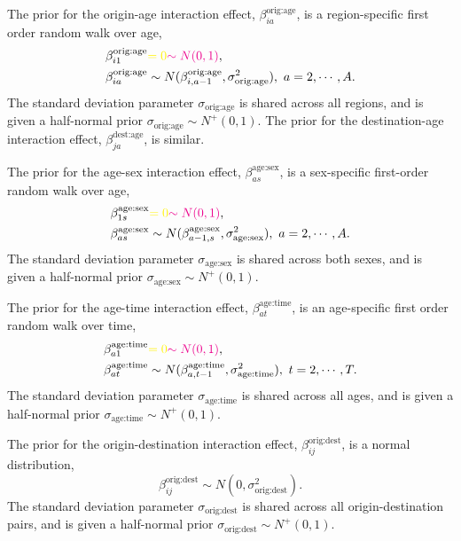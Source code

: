 \documentclass{article}
\begin{document}
The prior for the origin-age interaction effect, $\beta_{ia}^{\text{orig:age}}$, is a region-specific first order random walk over age,
\begin{equation}
\begin{aligned}
\beta_{i1}^{\text{orig:age}}&{\color{yellow}=0}{\color{magenta}\sim N(0,1)},\\
\beta_{ia}^{\text{orig:age}}&\sim N(\beta_{i,a-1}^{\text{orig:age}},\sigma_{\text{orig:age}}^2),\ a=2,\cdots,A.
\end{aligned}
\end{equation}
The standard deviation parameter $\sigma_{\text{orig:age}}$ is shared across all regions, and is given a half-normal prior $\sigma_{\text{orig:age}}\sim N^+(0,1)$. The prior for the destination-age interaction effect, $\beta_{ja}^{\text{dest:age}}$, is similar.

The prior for the age-sex interaction effect, $\beta_{as}^{\text{age:sex}}$, is a sex-specific first-order random walk over age,
\begin{equation}
\begin{aligned}
\beta_{1s}^{\text{age:sex}}&{\color{yellow}=0}{\color{magenta}\sim N(0,1)},\\
\beta_{as}^{\text{age:sex}}&\sim N(\beta_{a-1,s}^{\text{age:sex}},\sigma_{\text{age:sex}}^2),\ a=2,\cdots,A.
\end{aligned}
\end{equation}
The standard deviation parameter $\sigma_{\text{age:sex}}$ is shared across both sexes, and is given a half-normal prior $\sigma_{\text{age:sex}}\sim N^+(0,1)$.

The prior for the age-time interaction effect, $\beta_{at}^{\text{age:time}}$, is an age-specific first order random walk over time, \begin{equation}
\begin{aligned}
\beta_{a1}^{\text{age:time}}&{\color{yellow}=0}{\color{magenta}\sim N(0,1)},\\
\beta_{at}^{\text{age:time}}&\sim N(\beta_{a,t-1}^{\text{age:time}},\sigma_{\text{age:time}}^2),\ t=2,\cdots,T.
\end{aligned}
\end{equation}
The standard deviation parameter $\sigma_{\text{age:time}}$ is shared across all ages, and is given a half-normal prior $\sigma_{\text{age:time}}\sim N^+(0,1)$.

The prior for the origin-destination interaction effect, $\beta_{ij}^{\text{orig:dest}}$, is a normal distribution,
\begin{equation}
\beta_{ij}^{\text{orig:dest}}\sim N(0,\sigma_{\text{orig:dest}}^2).
\end{equation}
The standard deviation parameter $\sigma_{\text{orig:dest}}$ is shared across all origin-destination pairs, and is given a half-normal prior $\sigma_{\text{orig:dest}}\sim N^+(0,1)$.
\end{document}
